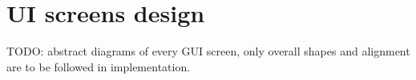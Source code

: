 \section{UI screens design}
TODO: abstract diagrams of every GUI screen, only overall shapes and alignment
are to be followed in implementation.